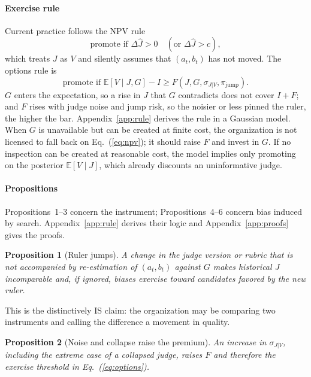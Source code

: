 \documentclass[acmsmall,screen,review,anonymous]{acmart}
\newtheorem{proposition}{Proposition}
\theoremstyle{acmdefinition}
\begin{document}
\paragraph{Exercise rule} Current practice follows the NPV rule
\begin{equation}\label{eq:npv}
\text{promote if } \Delta\hat{J} > 0 \quad (\text{or } \Delta\hat{J} > c),
\end{equation}
which treats $J$ as $V$ and silently assumes that $(a_t,b_t)$ has not moved. The options rule is
\begin{equation}\label{eq:options}
\text{promote if } \mathbb{E}[V \mid J, G] - I \ge F(J, G, \sigma_{J|V}, \pi_{\text{jump}}).
\end{equation}
$G$ enters the expectation, so a rise in $J$ that $G$ contradicts does not cover $I + F$; and $F$ rises with judge noise and jump risk, so the noisier or less pinned the ruler, the higher the bar. Appendix~\ref{app:rule} derives the rule in a Gaussian model. When $G$ is unavailable but can be created at finite cost, the organization is not licensed to fall back on Eq.~(\ref{eq:npv}); it should raise $F$ and invest in $G$. If no inspection can be created at reasonable cost, the model implies only promoting on the posterior $\mathbb{E}[V \mid J]$, which already discounts an uninformative judge.

\paragraph{Propositions} Propositions~1--3 concern the instrument; Propositions~4--6 concern bias induced by search. Appendix~\ref{app:rule} derives their logic and Appendix~\ref{app:proofs} gives the proofs.

\begin{proposition}[Ruler jumps]
A change in the judge version or rubric that is not accompanied by re-estimation of $(a_t,b_t)$ against $G$ makes historical $J$ incomparable and, if ignored, biases exercise toward candidates favored by the new ruler.
\end{proposition}

This is the distinctively IS claim: the organization may be comparing two instruments and calling the difference a movement in quality.

\begin{proposition}[Noise and collapse raise the premium]
An increase in $\sigma_{J|V}$, including the extreme case of a collapsed judge, raises $F$ and therefore the exercise threshold in Eq.~(\ref{eq:options}).
\end{proposition}
\end{document}

